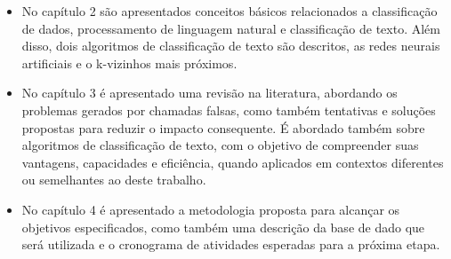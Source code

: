 \begin{itemize}
    \item No capítulo 2 são apresentados conceitos básicos relacionados a classificação de dados, processamento de linguagem natural e classificação de texto. Além disso, dois algoritmos de classificação de texto são descritos, as redes neurais artificiais e o k-vizinhos mais próximos.
    \item No capítulo 3 é apresentado uma revisão na literatura, abordando os problemas gerados por chamadas falsas, como também tentativas e soluções propostas para reduzir o impacto consequente. É abordado também sobre algoritmos de classificação de texto, com o objetivo de compreender suas vantagens, capacidades e eficiência, quando aplicados em contextos diferentes ou semelhantes ao deste trabalho.
    \item No capítulo 4 é apresentado a metodologia proposta para alcançar os objetivos especificados, como também uma descrição da base de dado que será utilizada e o cronograma de atividades esperadas para a próxima etapa.
\end{itemize}